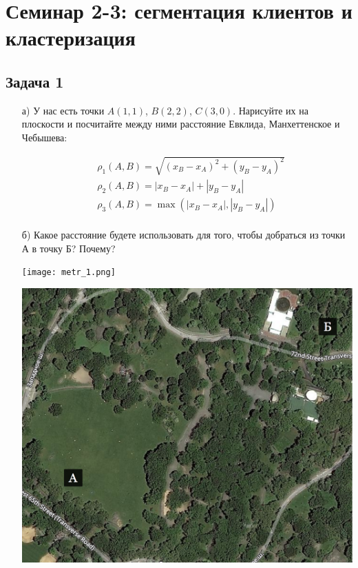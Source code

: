 \documentclass[12pt, a4paper, oneside]{article}
\begin{document}
\section*{Семинар 2-3:  сегментация клиентов и кластеризация}

\subsection*{Задача 1 }

\begin{enumerate}

\item[а)] У нас есть точки $A(1,1)$, $B(2,2)$, $C(3,0)$. Нарисуйте их на плоскости и посчитайте между ними расстояние Евклида, Манхеттенское и Чебышева: 

\begin{equation}
\begin{aligned}
& \rho_1(A,B) = \sqrt{(x_B - x_A)^2 + (y_B - y_A)^2} \\ 
& \rho_2(A,B) = |x_B - x_A| + |y_B - y_A|  \\
& \rho_3(A,B) = \max(|x_B - x_A|, |y_B - y_A|) \\
\end{aligned}
\end{equation}


\item[б)] Какое расстояние будете использовать для того, чтобы добраться из точки А в точку Б? Почему? 

\begin{minipage}[t]{0.45\textwidth}
	\texttt{[image: metr\_1.png]}
\end{minipage}
\hfill
\begin{minipage}[t]{0.45\textwidth}
	\includegraphics[scale=0.12]{metr_2.png}
\end{minipage}


\end{enumerate}
\end{document}

